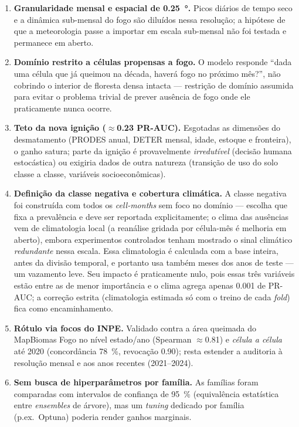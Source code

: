 \documentclass[tcc2]{uftex}
\begin{document}
\begin{enumerate}
  \item \textbf{Granularidade mensal e espacial de \SI{0,25}{\degree}.} Picos diários de tempo seco e a dinâmica sub-mensal do fogo são diluídos nessa resolução; a hipótese de que a meteorologia passe a importar em escala sub-mensal não foi testada e permanece em aberto.

  \item \textbf{Domínio restrito a células propensas a fogo.} O modelo responde ``dada uma célula que já queimou na década, haverá fogo no próximo mês?'', não cobrindo o interior de floresta densa intacta --- restrição de domínio assumida para evitar o problema trivial de prever ausência de fogo onde ele praticamente nunca ocorre.

  \item \textbf{Teto da nova ignição (\(\approx\)\num{0,23} PR-AUC).} Esgotadas as dimensões do desmatamento (PRODES anual, DETER mensal, idade, estoque e fronteira), o ganho satura; parte da ignição é provavelmente \emph{irredutível} (decisão humana estocástica) ou exigiria dados de outra natureza (transição de uso do solo classe a classe, variáveis socioeconômicas).

  \item \textbf{Definição da classe negativa e cobertura climática.} A classe negativa foi construída com todos os \emph{cell-months} sem foco no domínio --- escolha que fixa a prevalência e deve ser reportada explicitamente; o clima das ausências vem de climatologia local (a reanálise gridada por célula-mês é melhoria em aberto), embora experimentos controlados tenham mostrado o sinal climático \emph{redundante} nessa escala. Essa climatologia é calculada com a base inteira, antes da divisão temporal, e portanto usa também meses dos anos de teste --- um vazamento leve. Seu impacto é praticamente nulo, pois essas três variáveis estão entre as de menor importância e o clima agrega apenas \num{+0,001} de PR-AUC; a correção estrita (climatologia estimada só com o treino de cada \emph{fold}) fica como encaminhamento.

  \item \textbf{Rótulo via focos do INPE.} Validado contra a área queimada do MapBiomas Fogo no nível estado/ano (Spearman \(\approx\)\num{0,81}) e \emph{célula a célula} até 2020 (concordância \SI{78}{\percent}, revocação \num{0,90}); resta estender a auditoria à resolução mensal e aos anos recentes (2021--2024).

  \item \textbf{Sem busca de hiperparâmetros por família.} As famílias foram comparadas com intervalos de confiança de \SI{95}{\percent} (equivalência estatística entre \emph{ensembles} de árvore), mas um \emph{tuning} dedicado por família (p.ex.\ Optuna) poderia render ganhos marginais.


\end{enumerate}
\end{document}
